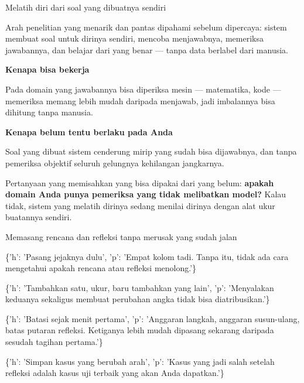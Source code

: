 \documentclass[aspectratio=169,11pt,t]{beamer}
\begin{document}
\begin{frame}[shrink=25]{Melatih diri dari soal yang dibuatnya sendiri}
{\fontsize{9.4}{12.6}\selectfont\color{fg2}Arah penelitian yang menarik dan pantas dipahami sebelum dipercaya: sistem membuat soal untuk dirinya sendiri, mencoba menjawabnya, memeriksa jawabannya, dan belajar dari yang benar --- tanpa data berlabel dari manusia.\par}\vskip 4pt
\begin{minipage}[t]{0.485\textwidth}
{\fontsize{9.4}{12.6}\selectfont\color{fg2}\textbf{Kenapa bisa bekerja}\par}\vskip 4pt
{\fontsize{9.4}{12.6}\selectfont\color{fg2}Pada domain yang jawabannya bisa diperiksa mesin --- matematika, kode --- memeriksa memang lebih mudah daripada menjawab, jadi imbalannya bisa dihitung tanpa manusia.\par}\vskip 4pt

\end{minipage}%
\hfill
\begin{minipage}[t]{0.485\textwidth}
{\fontsize{9.4}{12.6}\selectfont\color{fg2}\textbf{Kenapa belum tentu berlaku pada Anda}\par}\vskip 4pt
{\fontsize{9.4}{12.6}\selectfont\color{fg2}Soal yang dibuat sistem cenderung mirip yang sudah bisa dijawabnya, dan tanpa pemeriksa objektif seluruh gelungnya kehilangan jangkarnya.\par}\vskip 4pt

\end{minipage}%
\begin{iband}[signal]
Pertanyaan yang memisahkan yang bisa dipakai dari yang belum: \textbf{apakah domain Anda punya pemeriksa yang tidak melibatkan model?} Kalau tidak, sistem yang melatih dirinya sedang menilai dirinya dengan alat ukur buatannya sendiri.
\end{iband}
\end{frame}

\begin{frame}[shrink=25]{Memasang rencana dan refleksi tanpa merusak yang sudah jalan}
\begin{isteps}
\item \{'h': 'Pasang jejaknya dulu', 'p': 'Empat kolom tadi. Tanpa itu, tidak ada cara mengetahui apakah rencana atau refleksi menolong.'\}
\item \{'h': 'Tambahkan satu, ukur, baru tambahkan yang lain', 'p': 'Menyalakan keduanya sekaligus membuat perubahan angka tidak bisa diatribusikan.'\}
\item \{'h': 'Batasi sejak menit pertama', 'p': 'Anggaran langkah, anggaran susun-ulang, batas putaran refleksi. Ketiganya lebih mudah dipasang sekarang daripada sesudah tagihan pertama.'\}
\item \{'h': 'Simpan kasus yang berubah arah', 'p': 'Kasus yang jadi salah setelah refleksi adalah kasus uji terbaik yang akan Anda dapatkan.'\}
\end{isteps}
\end{frame}
\end{document}
